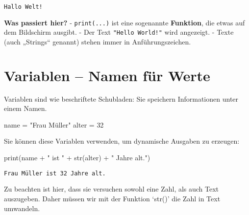 \documentclass[
  letterpaper,
  DIV=11,
  numbers=noendperiod]{scrreprt}
\newenvironment{Shaded}{\begin{snugshade}}{\end{snugshade}}
\newcommand{\BuiltInTok}[1]{\textcolor[rgb]{0.00,0.23,0.31}{#1}}
\newcommand{\DecValTok}[1]{\textcolor[rgb]{0.68,0.00,0.00}{#1}}
\newcommand{\NormalTok}[1]{\textcolor[rgb]{0.00,0.23,0.31}{#1}}
\newcommand{\OperatorTok}[1]{\textcolor[rgb]{0.37,0.37,0.37}{#1}}
\newcommand{\StringTok}[1]{\textcolor[rgb]{0.13,0.47,0.30}{#1}}
\begin{document}
\begin{verbatim}
Hallo Welt!
\end{verbatim}

\textbf{Was passiert hier?} - \texttt{print(...)} ist eine sogenannte
\textbf{Funktion}, die etwas auf dem Bildschirm ausgibt. - Der Text
\texttt{"Hello\ World!"} wird angezeigt. - Texte (auch „Strings``
genannt) stehen immer in Anführungszeichen.

\section{Variablen -- Namen für
Werte}\label{variablen-namen-fuxfcr-werte}

Variablen sind wie beschriftete Schubladen: Sie speichern Informationen
unter einem Namen.

\begin{Shaded}
\begin{Highlighting}[]
\NormalTok{name }\OperatorTok{=} \StringTok{"Frau Müller"}
\NormalTok{alter }\OperatorTok{=} \DecValTok{32}
\end{Highlighting}
\end{Shaded}

Sie können diese Variablen verwenden, um dynamische Ausgaben zu
erzeugen:

\begin{Shaded}
\begin{Highlighting}[]
\BuiltInTok{print}\NormalTok{(name }\OperatorTok{+} \StringTok{" ist "} \OperatorTok{+} \BuiltInTok{str}\NormalTok{(alter) }\OperatorTok{+} \StringTok{" Jahre alt."}\NormalTok{)}
\end{Highlighting}
\end{Shaded}

\begin{verbatim}
Frau Müller ist 32 Jahre alt.
\end{verbatim}

Zu beachten ist hier, dass sie versuchen sowohl eine Zahl, als auch Text
auszugeben. Daher müssen wir mit der Funktion `str()' die Zahl in Text
umwandeln.
\end{document}
